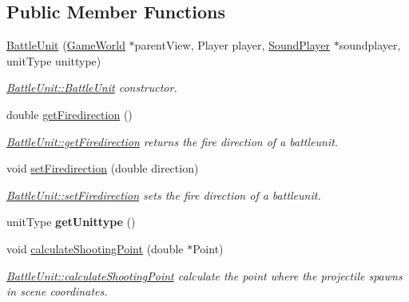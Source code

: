 \subsection*{Public Member Functions}
\begin{DoxyCompactItemize}
\item 
\hyperlink{class_battle_unit_ab89fc2d2730cc059c34bb7cd3473d2f0}{Battle\+Unit} (\hyperlink{class_game_world}{Game\+World} $\ast$parent\+View, Player player, \hyperlink{class_sound_player}{Sound\+Player} $\ast$soundplayer, unit\+Type unittype)
\begin{DoxyCompactList}\small\item\em \hyperlink{class_battle_unit_ab89fc2d2730cc059c34bb7cd3473d2f0}{Battle\+Unit\+::\+Battle\+Unit} constructor. \end{DoxyCompactList}\item 
double \hyperlink{class_battle_unit_aa5a7ea370e2f789b51f5617b45822bdb}{get\+Firedirection} ()
\begin{DoxyCompactList}\small\item\em \hyperlink{class_battle_unit_aa5a7ea370e2f789b51f5617b45822bdb}{Battle\+Unit\+::get\+Firedirection} returns the fire direction of a battleunit. \end{DoxyCompactList}\item 
void \hyperlink{class_battle_unit_ab038bbc9e82cea88af5a9228c0559463}{set\+Firedirection} (double direction)
\begin{DoxyCompactList}\small\item\em \hyperlink{class_battle_unit_ab038bbc9e82cea88af5a9228c0559463}{Battle\+Unit\+::set\+Firedirection} sets the fire direction of a battleunit. \end{DoxyCompactList}\item 
unit\+Type {\bfseries get\+Unittype} ()\hypertarget{class_battle_unit_a26e22880479bf89c7cc3cec7c8f84a0b}{}\label{class_battle_unit_a26e22880479bf89c7cc3cec7c8f84a0b}

\item 
void \hyperlink{class_battle_unit_a065ad7ba4c947aafd266b7a9e4c523a4}{calculate\+Shooting\+Point} (double $\ast$Point)
\begin{DoxyCompactList}\small\item\em \hyperlink{class_battle_unit_a065ad7ba4c947aafd266b7a9e4c523a4}{Battle\+Unit\+::calculate\+Shooting\+Point} calculate the point where the projectile spawns in scene coordinates. \end{DoxyCompactList}\end{DoxyCompactItemize}
